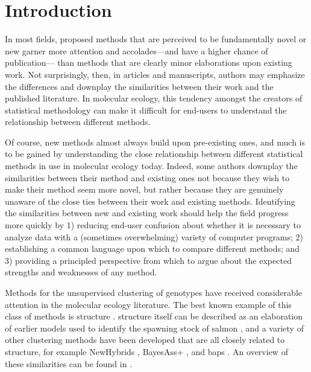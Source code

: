
\section*{Introduction}
In most fields, proposed methods that are 
perceived to be fundamentally novel or new garner more
attention and accolades---and have a higher chance of publication---
than methods that are clearly minor elaborations upon existing work. 
Not surprisingly, then, in articles and manuscripts, authors may 
emphasize the differences and downplay the similarities between their 
work and the published literature.   In molecular ecology, this 
tendency amongst the creators of statistical methodology can make it 
difficult for end-users to understand the relationship between 
different methods.

Of course, new methods almost always build upon pre-existing ones, and 
much is to be gained by understanding the close relationship between 
different statistical methods in use in molecular ecology today.  
Indeed, some authors downplay the similarities between their method and 
existing ones not because they wish to make their method seem more 
novel, but rather because they are genuinely unaware of the close ties 
between their work and existing methods.  Identifying the 
similarities between new and existing work should help the field 
progress more quickly by 1) reducing end-user confusion about whether 
it is necessary to analyze data with a (sometimes overwhelming) variety 
of computer programs; 2) establishing a common language upon which to 
compare different methods; and 3) providing a principled perspective 
from which to argue about the expected strengths and weaknesses of any 
method.

Methods for the unsupervised clustering of genotypes have received 
considerable attention in the molecular ecology literature.  
The best known example of this class of methods is {\sc structure} 
\citep{Pritchardetal2000}.  {\sc structure} itself can be described 
as an elaboration of earlier models used to identify the spawning 
stock of salmon \citep{Smouseetal1990}, and a variety of other 
clustering methods have been developed that are all closely related to 
{\sc structure}, for example {\sc NewHybrids} \citep{And&Tho2002}, {\sc 
BayesAss+} \citep{Wil&Ran2003}, and {\sc baps} 
\citep{Coranderetal2004}. An overview of these similarities can be 
found in \citet{Anderson2009PGAC}.

